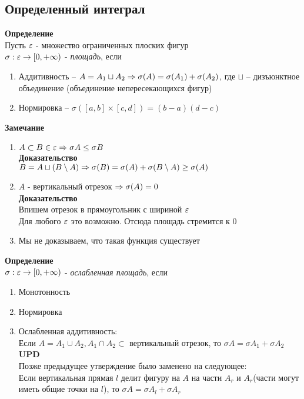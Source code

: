 \documentclass[12pt]{article}
\begin{document}
\subsection{Определенный интеграл}
\textbf{Определение}\\
Пусть $\varepsilon$ - множество ограниченных плоских фигур\\
$\sigma: \varepsilon \rightarrow [0, +\infty)$ - \textit{площадь}, если
\begin{enumerate}
    \item Аддитивность -- $A = A_1 \sqcup A_2 \Rightarrow \sigma(A) = \sigma(A_1)+\sigma(A_2)$, где $\sqcup$ -- дизъюнктное объединение (объединение непересекающихся фигур)
    \item Нормировка -- $\sigma([a,b]\times[c,d]) = (b-a)(d-c)$
\end{enumerate}
\textbf{Замечание}
\begin{enumerate}
    \item $A \subset B \in \varepsilon \Rightarrow \sigma A \leq \sigma B$\\
    \textbf{Доказательство}\\
    $B = A \sqcup (B \setminus A) \Rightarrow \sigma(B) = \sigma(A) + \sigma(B\setminus A) \geq \sigma(A)$
    \item $A$ - вертикальный отрезок $\Rightarrow \sigma(A) = 0$\\
    \textbf{Доказательство}\\
    Впишем отрезок в прямоугольник с шириной $\varepsilon$\\
    Для любого $\varepsilon$ это возможно. Отсюда площадь стремится к 0
    \item Мы не доказываем, что такая функция существует
\end{enumerate}
\textbf{Определение}\\
$\sigma: \varepsilon \rightarrow [0, +\infty)$ - \textit{ослабленная площадь}, если
\begin{enumerate}
    \item Монотонность
    \item Нормировка
    \item Ослабленная аддитивность:\\
    Если $A = A_1 \cup A_2, A_1 \cap A_2 \subset$ вертикальный отрезок, то $\sigma A = \sigma A_1 + \sigma A_2$\\
    \textbf{UPD}\\
    Позже предыдущее утверждение было заменено на следующее:\\
    Если вертикальная прямая $l$ делит фигуру на $A$ на части $A_r$ и $A_r$(части могут иметь общие точки на $l$), то $\sigma A = \sigma A_l + \sigma A_r$
\end{enumerate}
\end{document}
